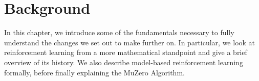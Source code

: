 \section{Background}
In this chapter, we introduce some of the fundamentals necessary to fully understand the changes we set out to make further on. In particular, we look at reinforcement learning from a more mathematical standpoint and give a brief overview of its history. We also describe model-based reinforcement learning formally, before finally explaining the MuZero Algorithm.






